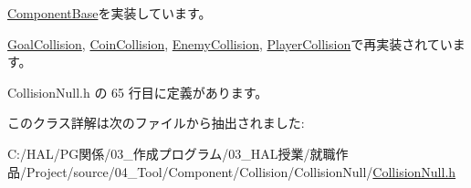 \mbox{\hyperlink{class_component_base_a58e66d65bc8f3cd5ab67b4b2deab4fc2}{Component\+Base}}を実装しています。



\mbox{\hyperlink{class_goal_collision_a1e3995dc2f5ba2678580d06699ca6936}{Goal\+Collision}}, \mbox{\hyperlink{class_coin_collision_a981fd9b1b8c688a757a456a56d80501b}{Coin\+Collision}}, \mbox{\hyperlink{class_enemy_collision_ab54133504d867c6d2070d2f3854a0aaf}{Enemy\+Collision}}, \mbox{\hyperlink{class_player_collision_a09f97f220903f5724a3af6b97af3a336}{Player\+Collision}}で再実装されています。



 Collision\+Null.\+h の 65 行目に定義があります。



このクラス詳解は次のファイルから抽出されました\+:\begin{DoxyCompactItemize}
\item 
C\+:/\+H\+A\+L/\+P\+G関係/03\+\_\+作成プログラム/03\+\_\+\+H\+A\+L授業/就職作品/\+Project/source/04\+\_\+\+Tool/\+Component/\+Collision/\+Collision\+Null/\mbox{\hyperlink{_collision_null_8h}{Collision\+Null.\+h}}\end{DoxyCompactItemize}
